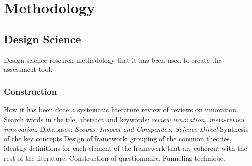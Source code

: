 
\chapter{Methodology} %

\label{Chapter3} %



\section{Design Science}



Design science research methodology that it has been used to create the assessment tool.

\subsection{Construction}
\label{subsec:Construction}
How it has been done a systematic literature review of reviews on innovation. %
Search words in the tile, abstract and keywords: \textit{review innovation, meta-review innovation}. Databases: \textit{Scopus, Inspect and Compendex, Science Direct}
Synthesis of the key concepts
Design of framework: grouping of the common theories, identify definitions for each element of the framework that are coherent with the rest of the literature.
Construction of questionnaire. Funneling technique.
